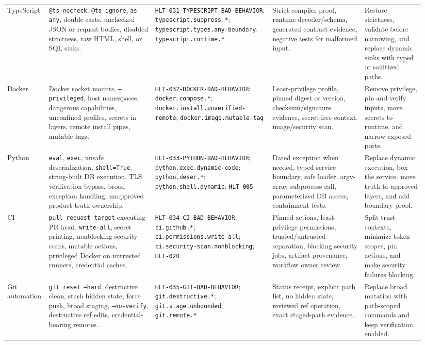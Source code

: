 \begin{longtable}{L{0.12\textwidth} L{0.23\textwidth} L{0.18\textwidth} L{0.24\textwidth} L{0.15\textwidth}}
TypeScript & \texttt{@ts-nocheck}, \texttt{@ts-ignore}, \texttt{as any}, double casts, unchecked JSON or request bodies, disabled strictness, raw HTML, shell, or SQL sinks. & \texttt{HLT-031-TYPESCRIPT-BAD-BEHAVIOR}; \texttt{typescript.suppress.*}; \texttt{typescript.types.any-boundary}; \texttt{typescript.runtime.*} & Strict compiler proof, runtime decoder/schema, generated contract evidence, negative tests for malformed input. & Restore strictness, validate before narrowing, and replace dynamic sinks with typed or sanitized paths. \\
Docker & Docker socket mounts, \texttt{--privileged}, host namespaces, dangerous capabilities, unconfined profiles, secrets in layers, remote install pipes, mutable tags. & \texttt{HLT-032-DOCKER-BAD-BEHAVIOR}; \texttt{docker.compose.*}; \texttt{docker.install.unverified-remote}; \texttt{docker.image.mutable-tag} & Least-privilege profile, pinned digest or version, checksum/signature evidence, secret-free context, image/security scan. & Remove privilege, pin and verify inputs, move secrets to runtime, and narrow exposed ports. \\
Python & \texttt{eval}, \texttt{exec}, unsafe deserialization, \texttt{shell=True}, string-built DB execution, TLS verification bypass, broad exception handling, unapproved product-truth ownership. & \texttt{HLT-033-PYTHON-BAD-BEHAVIOR}; \texttt{python.exec.dynamic-code}; \texttt{python.deser.*}; \texttt{python.shell.dynamic}; \texttt{HLT-005} & Dated exception when needed, typed service boundary, safe loader, argv-array subprocess call, parameterized DB access, containment tests. & Replace dynamic execution, box the service, move truth to approved layers, and add boundary proof. \\
CI & \texttt{pull\_request\_target} executing PR head, \texttt{write-all}, secret printing, nonblocking security scans, mutable actions, privileged Docker on untrusted runners, credential caches. & \texttt{HLT-034-CI-BAD-BEHAVIOR}; \texttt{ci.github.*}; \texttt{ci.permissions.write-all}; \texttt{ci.security-scan.nonblocking}; \texttt{HLT-020} & Pinned actions, least-privilege permissions, trusted/untrusted separation, blocking security jobs, artifact provenance, workflow owner review. & Split trust contexts, minimize token scopes, pin actions, and make security failures blocking. \\
Git automation & \texttt{git reset --hard}, destructive clean, stash hidden state, force push, broad staging, \texttt{--no-verify}, destructive ref edits, credential-bearing remotes. & \texttt{HLT-035-GIT-BAD-BEHAVIOR}; \texttt{git.destructive.*}; \texttt{git.stage.unbounded}; \texttt{git.remote.*} & Status receipt, explicit path list, no hidden state, reviewed ref operation, exact staged-path evidence. & Replace broad mutation with path-scoped commands and keep verification enabled. \\

\end{longtable}
